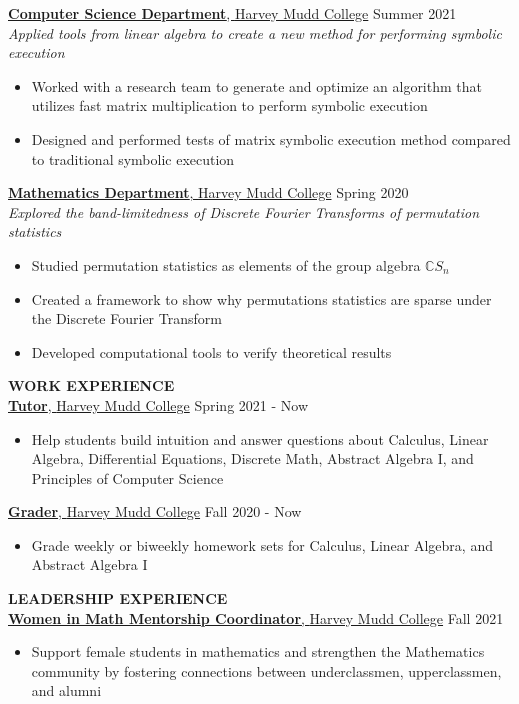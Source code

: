 \documentclass[11pt]{article}
\newcommand{\hdr}[1]{\textcolor{blue(ryb)}{\textbf{#1}}}
\newcommand{\role}[3]{\underline{\textbf{#1}, {#2}} \hfill #3}
\begin{document}
\smallskip
\role{Computer Science Department}{Harvey Mudd College}{Summer 2021}\\
\textit{Applied tools from linear algebra to create a new method for performing symbolic execution}\\
\begin{itemize}
\item Worked with a research team to generate and optimize an algorithm that utilizes fast matrix multiplication to perform symbolic execution\\
\item Designed and performed tests of matrix symbolic execution method compared to traditional symbolic execution
\end{itemize}
\smallskip
\role{Mathematics Department}{Harvey Mudd College}{Spring 2020}\\
\textit{Explored the band-limitedness of Discrete Fourier Transforms of permutation statistics}\\
\begin{itemize}
  \item Studied permutation statistics as elements of the group algebra $\mathbb{C} S_n$
  \item Created a framework to show why permutations statistics are sparse under the Discrete Fourier Transform
  \item Developed computational tools to verify theoretical results
\end{itemize}
\medskip
\hdr{WORK EXPERIENCE}\\
\role{Tutor}{Harvey Mudd College}{Spring 2021 - Now}
\begin{itemize}
\item Help students build intuition and answer questions about Calculus, Linear Algebra, Differential Equations, Discrete Math, Abstract Algebra I, and Principles of Computer Science
\end{itemize}
\smallskip
\role{Grader}{Harvey Mudd College}{Fall 2020 - Now}\\
\begin{itemize}
\item Grade weekly or biweekly homework sets for Calculus, Linear Algebra, and Abstract Algebra I
\end{itemize}
\bigskip
\hdr{LEADERSHIP EXPERIENCE}\\
\role{Women in Math Mentorship Coordinator}{Harvey Mudd College}{Fall 2021}
\begin{itemize}
\item Support female students in mathematics and strengthen the Mathematics community by fostering connections between underclassmen, upperclassmen, and alumni
\end{itemize}
\end{document}
